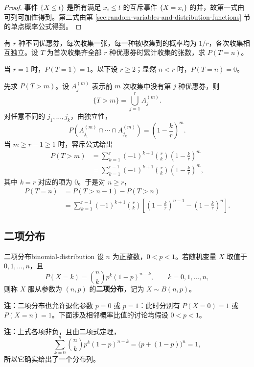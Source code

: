 \begin{proof}
事件 $\{X\leq t\}$ 是所有满足 $x_i\leq t$ 的互斥事件 $\{X=x_i\}$ 的并，故第一式由可列可加性得到。第二式由第 \ref{sec:random-variables-and-distribution-functions} 节的单点概率公式得到。
\end{proof}

\begin{example}[收集齐优惠券所需的张数]
有 $r$ 种不同优惠券，每次收集一张，每一种被收集到的概率均为 $1/r$，各次收集相互独立。设 $T$ 为首次收集齐全部 $r$ 种优惠券时累计收集的张数，求 $P(T=n)$。

当 $r=1$ 时，$P(T=1)=1$。以下设 $r\geq2$；显然 $n<r$ 时，$P(T=n)=0$。

先求 $P(T>m)$。设 $A_j^{(m)}$ 表示前 $m$ 次收集中没有第 $j$ 种优惠券，则
\[
\{T>m\}=\bigcup_{j=1}^rA_j^{(m)}.
\]
对任意不同的 $j_1,\ldots,j_k$，由独立性，
\[
P\left(A_{j_1}^{(m)}\cap\cdots\cap A_{j_k}^{(m)}\right)
=\left(1-\frac kr\right)^m.
\]
当 $m\geq r-1\geq1$ 时，容斥公式给出
\[
\begin{aligned}
P(T>m)
&=\sum_{k=1}^r(-1)^{k+1}\binom rk
\left(1-\frac kr\right)^m\\
&=\sum_{k=1}^{r-1}(-1)^{k+1}\binom rk
\left(1-\frac kr\right)^m,
\end{aligned}
\]
其中 $k=r$ 对应的项为 $0$。于是对 $n\geq r$，
\[
\begin{aligned}
P(T=n)
&=P(T>n-1)-P(T>n)\\
&=\sum_{k=1}^{r-1}(-1)^{k+1}\binom rk
\left[
\left(1-\frac kr\right)^{n-1}
-\left(1-\frac kr\right)^n
\right].
\end{aligned}
\]
\end{example}
\newpage
\subsection*{二项分布}

\begin{mydefinition}{二项分布}{binomial-distribution}
设 $n$ 为正整数，$0<p<1$。若随机变量 $X$ 取值于 $0,1,\ldots,n$，且
\[
P(X=k)=\binom nk p^k(1-p)^{n-k},
\qquad k=0,1,\ldots,n,
\]
则称 $X$ 服从参数为 $(n,p)$ 的\textbf{二项分布}，记为 $X\sim B(n,p)$。
\end{mydefinition}

\textbf{注：}\quad 二项分布也允许退化参数 $p=0$ 或 $p=1$：此时分别有 $P(X=0)=1$ 或 $P(X=n)=1$。下面涉及相邻概率比值的讨论均假设 $0<p<1$。

\textbf{注：}\quad 上式各项非负，且由二项式定理，
\[
\sum_{k=0}^n\binom nk p^k(1-p)^{n-k}
=\bigl(p+(1-p)\bigr)^n=1,
\]
所以它确实给出了一个分布列。

